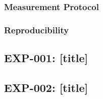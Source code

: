\subsubsection{Measurement Protocol}
\label{sec:method-protocol}

\subsubsection{Reproducibility}
\label{sec:method-reproducibility}


\subsection{EXP-001: [title]}
\label{sec:method-exp001}

\subsection{EXP-002: [title]}
\label{sec:method-exp002}

